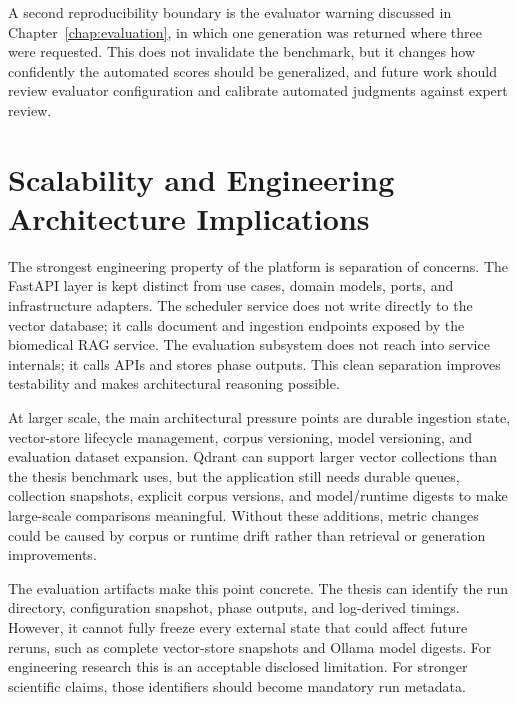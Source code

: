 A second reproducibility boundary is the evaluator warning discussed in Chapter~\ref{chap:evaluation}, in which one generation was returned where three were requested. This does not invalidate the benchmark, but it changes how confidently the automated scores should be generalized, and future work should review evaluator configuration and calibrate automated judgments against expert review.

\section{Scalability and Engineering Architecture Implications}

The strongest engineering property of the platform is separation of concerns. The FastAPI layer is kept distinct from use cases, domain models, ports, and infrastructure adapters. The scheduler service does not write directly to the vector database; it calls document and ingestion endpoints exposed by the biomedical RAG service. The evaluation subsystem does not reach into service internals; it calls APIs and stores phase outputs. This clean separation improves testability and makes architectural reasoning possible.

At larger scale, the main architectural pressure points are durable ingestion state, vector-store lifecycle management, corpus versioning, model versioning, and evaluation dataset expansion. Qdrant can support larger vector collections than the thesis benchmark uses, but the application still needs durable queues, collection snapshots, explicit corpus versions, and model/runtime digests to make large-scale comparisons meaningful. Without these additions, metric changes could be caused by corpus or runtime drift rather than retrieval or generation improvements.

The evaluation artifacts make this point concrete. The thesis can identify the run directory, configuration snapshot, phase outputs, and log-derived timings. However, it cannot fully freeze every external state that could affect future reruns, such as complete vector-store snapshots and Ollama model digests. For engineering research this is an acceptable disclosed limitation. For stronger scientific claims, those identifiers should become mandatory run metadata.

